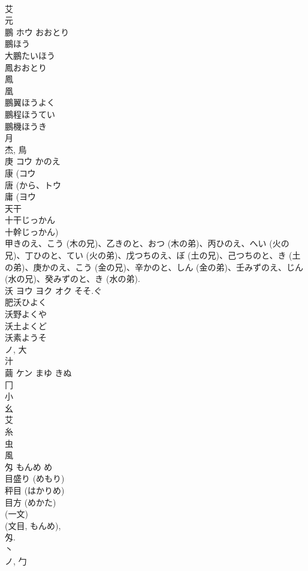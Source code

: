 \documentclass[8pt]{extreport}
\begin{document}
\begin{CJK}{UTF8}{min}
\\	艾 
\\	元 
\\	鵬	ホウ	おおとり	
\\	鵬ほう 
\\	大鵬たいほう 
\\	鳳おおとり 
\\	鳳 
\\	凰 
\\	鵬翼ほうよく 
\\	鵬程ほうてい 
\\	鵬機ほうき 
\\	月 
\\	杰, 鳥 
\\	庚	コウ	かのえ	
\\	康 (コウ 
\\	唐 (から、トウ 
\\	庸 (ヨウ 
\\	天干 
\\	十干じっかん 
\\	十幹じっかん) 
\\	甲きのえ、こう (木の兄)、乙きのと、おつ (木の弟)、丙ひのえ、へい (火の兄)、丁ひのと、てい (火の弟)、戊つちのえ、ぼ (土の兄)、己つちのと、き (土の弟)、庚かのえ、こう (金の兄)、辛かのと、しん (金の弟)、壬みずのえ、じん (水の兄)、癸みずのと、き (水の弟). 
\\	沃	ヨウ ヨク オク	そそ.ぐ	
\\	肥沃ひよく 
\\	沃野よくや 
\\	沃土よくど 
\\	沃素ようそ 
\\	ノ, 大 
\\	汁 
\\	繭	ケン	まゆ きぬ	
\\	冂 
\\	小 
\\	幺 
\\	艾 
\\	糸 
\\	虫 
\\	風 
\\	匁		もんめ め	
\\	目盛り (めもり) 
\\	秤目 (はかりめ) 
\\	目方 (めかた) 
\\	(一文) 
\\	(文目, もんめ), 
\\	匁.
\\	丶 
\\	ノ, 勹 

\end{CJK}
\end{document}
